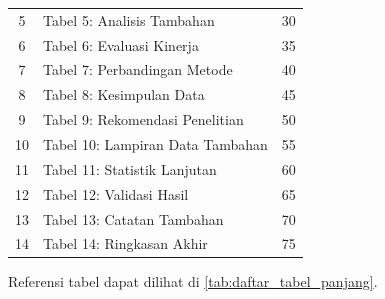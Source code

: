 \begin{longtable}{c p{8cm} c}
	5 & Tabel 5: Analisis Tambahan & 30 \\
	6 & Tabel 6: Evaluasi Kinerja & 35 \\
	7 & Tabel 7: Perbandingan Metode & 40 \\
	8 & Tabel 8: Kesimpulan Data & 45 \\
	9 & Tabel 9: Rekomendasi Penelitian & 50 \\
	10 & Tabel 10: Lampiran Data Tambahan & 55 \\
	11 & Tabel 11: Statistik Lanjutan & 60 \\
	12 & Tabel 12: Validasi Hasil & 65 \\
	13 & Tabel 13: Catatan Tambahan & 70 \\
	14 & Tabel 14: Ringkasan Akhir & 75 \\
\end{longtable}

Referensi tabel dapat dilihat di \ref{tab:daftar_tabel_panjang}.

